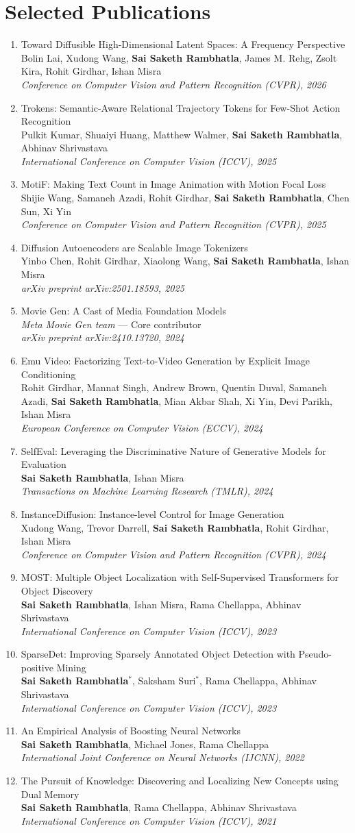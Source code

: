 \documentclass[10pt, letterpaper]{article}
\newcommand{\pub}[3]{\item\begin{minipage}[t]{\linewidth}#1\\{\small #2}\\{\small\itshape\color{muted} #3}\end{minipage}}
\newcommand{\me}{\textbf{Sai Saketh Rambhatla}}
\begin{document}
\section{Selected Publications}
\begin{enumerate}[leftmargin=0.7cm, topsep=0pt, itemsep=4pt, label={\small\color{accent}\arabic*.}]
\pub{Toward Diffusible High-Dimensional Latent Spaces: A Frequency Perspective}{Bolin Lai, Xudong Wang, \me, James M. Rehg, Zsolt Kira, Rohit Girdhar, Ishan Misra}{Conference on Computer Vision and Pattern Recognition (CVPR), 2026}
\pub{Trokens: Semantic-Aware Relational Trajectory Tokens for Few-Shot Action Recognition}{Pulkit Kumar, Shuaiyi Huang, Matthew Walmer, \me, Abhinav Shrivastava}{International Conference on Computer Vision (ICCV), 2025}
\pub{MotiF: Making Text Count in Image Animation with Motion Focal Loss}{Shijie Wang, Samaneh Azadi, Rohit Girdhar, \me, Chen Sun, Xi Yin}{Conference on Computer Vision and Pattern Recognition (CVPR), 2025}
\pub{Diffusion Autoencoders are Scalable Image Tokenizers}{Yinbo Chen, Rohit Girdhar, Xiaolong Wang, \me, Ishan Misra}{arXiv preprint arXiv:2501.18593, 2025}
\pub{Movie Gen: A Cast of Media Foundation Models}{\textit{Meta Movie Gen team} --- Core contributor}{arXiv preprint arXiv:2410.13720, 2024}
\pub{Emu Video: Factorizing Text-to-Video Generation by Explicit Image Conditioning}{Rohit Girdhar, Mannat Singh, Andrew Brown, Quentin Duval, Samaneh Azadi, \me, Mian Akbar Shah, Xi Yin, Devi Parikh, Ishan Misra}{European Conference on Computer Vision (ECCV), 2024}
\pub{SelfEval: Leveraging the Discriminative Nature of Generative Models for Evaluation}{\me, Ishan Misra}{Transactions on Machine Learning Research (TMLR), 2024}
\pub{InstanceDiffusion: Instance-level Control for Image Generation}{Xudong Wang, Trevor Darrell, \me, Rohit Girdhar, Ishan Misra}{Conference on Computer Vision and Pattern Recognition (CVPR), 2024}
\pub{MOST: Multiple Object Localization with Self-Supervised Transformers for Object Discovery}{\me, Ishan Misra, Rama Chellappa, Abhinav Shrivastava}{International Conference on Computer Vision (ICCV), 2023}
\pub{SparseDet: Improving Sparsely Annotated Object Detection with Pseudo-positive Mining}{\me$^{*}$, Saksham Suri$^{*}$, Rama Chellappa, Abhinav Shrivastava}{International Conference on Computer Vision (ICCV), 2023}
\pub{An Empirical Analysis of Boosting Neural Networks}{\me, Michael Jones, Rama Chellappa}{International Joint Conference on Neural Networks (IJCNN), 2022}
\pub{The Pursuit of Knowledge: Discovering and Localizing New Concepts using Dual Memory}{\me, Rama Chellappa, Abhinav Shrivastava}{International Conference on Computer Vision (ICCV), 2021}

\end{enumerate}
\end{document}

